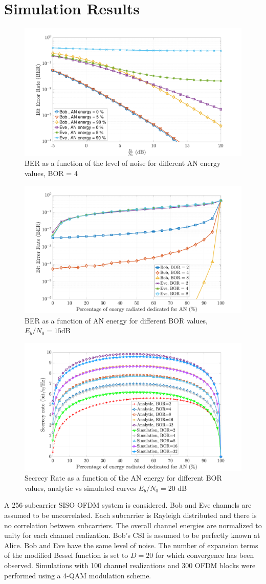 \documentclass[conference]{IEEEtran}
\begin{document}
\section{Simulation Results}
\begin{figure}[t]
    \centering
    \centerline{\includegraphics[width = .4\textwidth]{img/ber_ebno_alpha_bor_globcom.pdf}}
    \caption{BER as a function of the level of noise for different AN energy values, BOR = 4}
    \label{fig:ber_ebno}
\end{figure}

\begin{figure}[t]
    \centering
    \centerline{\includegraphics[width = .4\textwidth]{img/ber_alpha_bor_ebno_globcom.pdf}}
    \caption{BER as a function of AN energy for different BOR values, $E_b/N_0 = 15$dB}
    \label{fig:ber_alpha}
\end{figure}


\begin{figure}[t]
    \centering
    \centerline{\includegraphics[width = .43\textwidth]{img/ICNC_simu_anal.pdf}}
    \caption{Secrecy Rate as a function of the AN energy for different BOR values, analytic vs simulated curves $E_b/N_0=20$ dB }
    \label{fig:secrecy_alpha_bor}
\end{figure}

\label{sec:result}
A 256-subcarrier SISO OFDM system is considered. Bob and Eve channels are assumed to be uncorrelated. Each subcarrier is Rayleigh distributed and there is no correlation between subcarriers. The overall channel energies are normalized to unity for each channel realization. Bob's CSI is assumed to be perfectly known at Alice. Bob and Eve have the same level of noise. The number of expansion terms of the modified Bessel function is set to $D=20$ for which convergence has been observed. Simulations with 100 channel realizations and 300 OFDM blocks were performed using a 4-QAM modulation scheme. 
\end{document}
